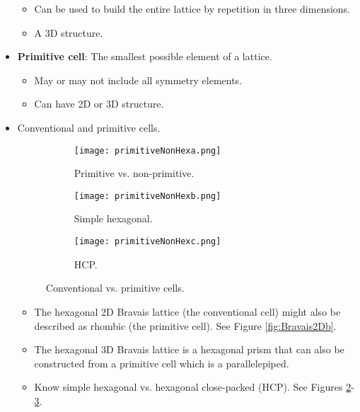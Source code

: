\documentclass[../notes.tex]{subfiles}
\begin{document}
\begin{itemize}
    \begin{itemize}
        \item Can be used to build the entire lattice by repetition in three dimensions.
        \item A 3D structure.
    \end{itemize}
    \item \textbf{Primitive cell}: The smallest possible element of a lattice.
    \begin{itemize}
        \item May or may not include all symmetry elements.
        \item Can have 2D or 3D structure.
    \end{itemize}
    \item Conventional and primitive cells.
    \begin{figure}[h!]
        \centering
        \begin{subfigure}[b]{0.33\linewidth}
            \centering
            \texttt{[image: primitiveNonHexa.png]}
            \caption{Primitive vs. non-primitive.}
            \label{fig:primitiveNonHexa}
        \end{subfigure}
        \begin{subfigure}[b]{0.32\linewidth}
            \centering
            \texttt{[image: primitiveNonHexb.png]}
            \caption{Simple hexagonal.}
            \label{fig:primitiveNonHexb}
        \end{subfigure}
        \begin{subfigure}[b]{0.33\linewidth}
            \centering
            \texttt{[image: primitiveNonHexc.png]}
            \caption{HCP.}
            \label{fig:primitiveNonHexc}
        \end{subfigure}
        \caption{Conventional vs. primitive cells.}
        \label{fig:primitiveNonHex}
    \end{figure}
    \begin{itemize}
        \item The hexagonal 2D Bravais lattice (the conventional cell) might also be described as rhombic (the primitive cell). See Figure \ref{fig:Bravais2Db}.
        \item The hexagonal 3D Bravais lattice is a hexagonal prism that can also be constructed from a primitive cell which is a parallelepiped.
        \item Know simple hexagonal vs. hexagonal close-packed (HCP). See Figures \ref{fig:primitiveNonHexb}-\ref{fig:primitiveNonHexc}.

\end{itemize}
\end{itemize}
\end{document}
